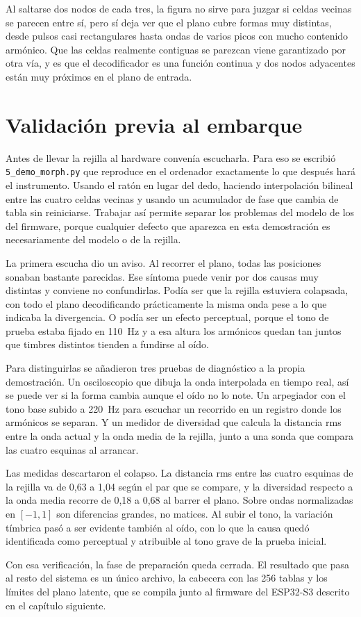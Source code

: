 Al saltarse dos nodos de cada tres, la figura no sirve para juzgar si celdas
vecinas se parecen entre sí, pero sí deja ver que el plano cubre formas muy
distintas, desde pulsos casi rectangulares hasta ondas de varios picos con mucho
contenido armónico. Que las celdas realmente contiguas se parezcan viene
garantizado por otra vía, y es que el decodificador es una función continua y
dos nodos adyacentes están muy próximos en el plano de entrada.

\section{Validación previa al embarque}
\label{sec:demo}

Antes de llevar la rejilla al hardware convenía escucharla. Para eso se escribió
\texttt{5\_\allowbreak demo\_\allowbreak morph.py} que reproduce en el ordenador exactamente lo que
después hará el instrumento. Usando el ratón en lugar del dedo, haciendo interpolación
bilineal entre las cuatro celdas vecinas y usando un acumulador de fase que cambia de
tabla sin reiniciarse. Trabajar así permite separar los problemas del modelo de
los del firmware, porque cualquier defecto que aparezca en esta demostración es
necesariamente del modelo o de la rejilla.

La primera escucha dio un aviso. Al recorrer el plano, todas las posiciones
sonaban bastante parecidas. Ese síntoma puede venir por dos causas muy distintas y
conviene no confundirlas. Podía ser que la rejilla estuviera colapsada, con todo
el plano decodificando prácticamente la misma onda pese a lo que indicaba la
divergencia. O podía ser un efecto perceptual, porque el tono de prueba estaba
fijado en 110~Hz y a esa altura los armónicos quedan tan juntos que timbres
distintos tienden a fundirse al oído.

Para distinguirlas se añadieron tres pruebas de diagnóstico a la propia
demostración. Un osciloscopio que dibuja la onda interpolada en tiempo real, 
así se puede ver si la forma cambia aunque el oído no lo note. Un arpegiador con el
tono base subido a 220~Hz para escuchar un recorrido en un registro donde
los armónicos se separan. Y un medidor de diversidad que calcula la distancia
\gls{rms} entre la onda actual y la onda media de la rejilla, junto a una sonda
que compara las cuatro esquinas al arrancar.

Las medidas descartaron el colapso. La distancia \gls{rms} entre las cuatro
esquinas de la rejilla va de 0,63 a 1,04 según el par que se compare, y la
diversidad respecto a la onda media recorre de 0,18 a 0,68 al barrer el plano.
Sobre ondas normalizadas en $[-1, 1]$ son diferencias grandes, no matices. Al
subir el tono, la variación tímbrica pasó a ser evidente también al oído, con lo
que la causa quedó identificada como perceptual y atribuible al tono grave de la
prueba inicial.

Con esa verificación, la fase de preparación queda cerrada. El resultado que
pasa al resto del sistema es un único archivo, la cabecera con las 256 tablas y
los límites del plano latente, que se compila junto al firmware del ESP32-S3
descrito en el capítulo siguiente.
